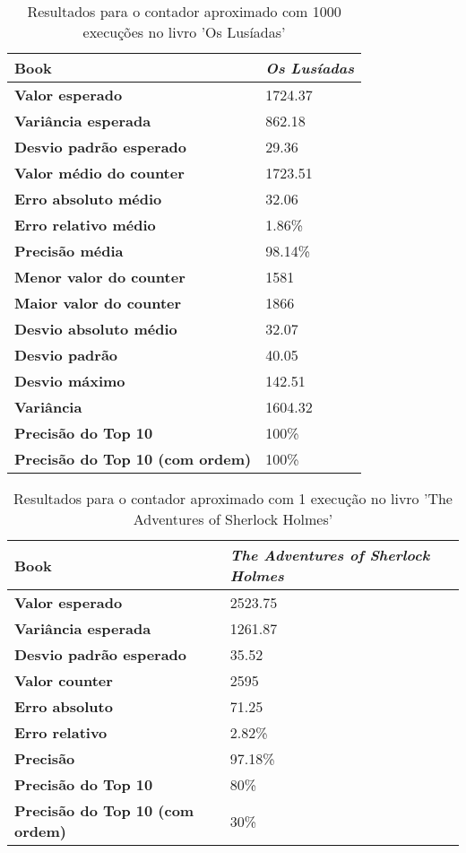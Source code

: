 \documentclass[shortpaper, portugues, times, mirror]{revdetua}
\begin{document}
\begin{table}[H]
\centering
\begin{tabular}{|l|l|}
\hline
\textbf{Book}            & \textit{Os Lusíadas}\\ \hline
\textbf{Valor esperado}         & 1724.37\\ \hline
\textbf{Variância esperada}& 862.18\\ \hline
\textbf{Desvio padrão esperado}   & 29.36\\ \hline
\hline
\textbf{Valor médio do counter}   & 1723.51\\ \hline
\textbf{Erro absoluto médio}   & 32.06\\ \hline
\textbf{Erro relativo médio}   & 1.86\%\\ \hline
\textbf{Precisão média}   & 98.14\%\\ \hline
\textbf{Menor valor do counter}   & 1581\\ \hline
\textbf{Maior valor do counter}   & 1866\\ \hline
\textbf{Desvio absoluto médio}   & 32.07\\ \hline
\textbf{Desvio padrão}   & 40.05\\ \hline
\textbf{Desvio máximo}   & 142.51\\ \hline
\textbf{Variância}   & 1604.32\\ \hline
\textbf{Precisão do Top 10}   & 100\%\\ \hline
\textbf{Precisão do Top 10 (com ordem)}   & 100\%\\ \hline
\end{tabular}
\caption{Resultados para o contador aproximado com 1000 execuções no livro 'Os Lusíadas'}
\label{tab:approximate}
\end{table}

\begin{table}[H]
\centering
\begin{tabular}{|l|p{2cm}|}
\hline
\textbf{Book}            & \textit{The Adventures of Sherlock Holmes}\\ \hline
\textbf{Valor esperado}         & 2523.75\\ \hline
\textbf{Variância esperada}       & 1261.87\\ \hline
\textbf{Desvio padrão esperado}   & 35.52\\ \hline
\hline
\textbf{Valor counter}   & 2595\\ \hline
\textbf{Erro absoluto}   & 71.25\\ \hline
\textbf{Erro relativo}   & 2.82\%\\ \hline
\textbf{Precisão}   & 97.18\%\\ \hline
\textbf{Precisão do Top 10}   & 80\%\\ \hline
\textbf{Precisão do Top 10 (com ordem)}   & 30\%\\ \hline
\end{tabular}
\caption{Resultados para o contador aproximado com 1 execução no livro 'The Adventures of Sherlock Holmes'}
\label{tab:approximate}
\end{table}
\end{document}
